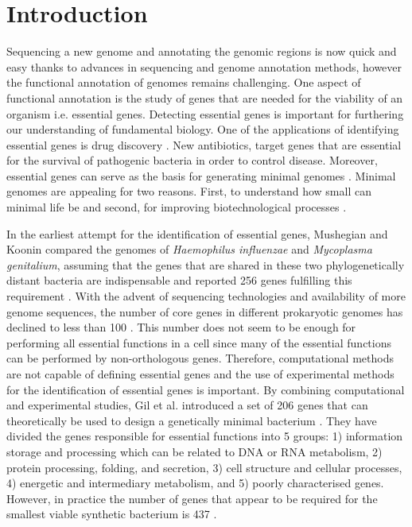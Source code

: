 \documentclass[12pt,letterpaper]{article}
\begin{document}
\section{Introduction}
Sequencing a new genome and annotating the genomic regions is now quick and easy thanks to advances in sequencing and genome annotation methods, however the functional annotation of genomes remains challenging. One aspect of functional annotation is the study of genes that are needed for the viability of an organism i.e. essential genes. Detecting essential genes  is important for furthering our understanding of fundamental biology. One of the applications of identifying essential genes is drug discovery \cite{juhas_essential_2012}. New antibiotics, target genes that are essential for the survival of pathogenic bacteria in order to control disease. Moreover, essential genes can serve as the basis for generating minimal genomes \cite{glass_essential_2006, hutchison_global_1999}. Minimal genomes are appealing for two reasons. First, to understand how small can minimal life be and second, for improving biotechnological processes \cite{martinez-garcia_quest_2016}.

In the earliest attempt for the identification of essential genes, Mushegian and Koonin compared the genomes of \textit{Haemophilus influenzae} and \textit{Mycoplasma genitalium}, assuming that the genes that are shared in these two phylogenetically distant bacteria are indispensable and reported 256 genes fulfilling this requirement \cite{mushegian_minimal_1996}. With the advent of sequencing technologies and availability of more genome sequences, the number of core genes in different prokaryotic genomes has declined to less than 100 \cite{brown_universal_2001, koonin_comparative_2003, harris_genetic_2003}. This number does not seem to be enough for performing all essential functions in a cell since many of the essential functions can be performed by non-orthologous genes. Therefore, computational methods are not capable of defining essential genes and the use of experimental methods for the identification of essential genes is important. By combining computational and experimental studies, Gil et al. introduced a set of 206 genes that can theoretically be used to design a genetically minimal bacterium \cite{gil_determination_2004}. They have divided the genes responsible for essential functions into 5 groups: 1) information storage and processing which can be related to DNA or RNA metabolism, 2) protein processing, folding, and secretion, 3) cell structure and cellular processes, 4) energetic and intermediary metabolism, and 5) poorly characterised genes. However, in practice the number of genes that appear to be required for the smallest viable synthetic bacterium is 437 \cite{hutchison_design_2016}.
\end{document}
